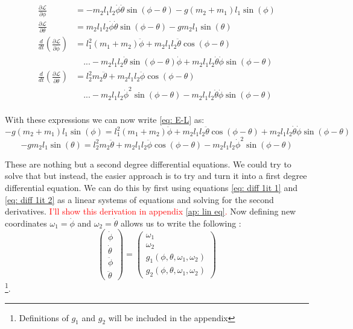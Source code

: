 \documentclass[twocolumn]{revtex4-2}
\newcommand{\Lagr}{\mathcal{L}}
\begin{document}
\begin{align*}
	\frac{\partial \Lagr}{\partial \phi} &= - m_2l_1l_2\dot \phi \dot \theta \sin{(\phi - \theta)} -
	g(m_2+m_1)l_1\sin{(\phi)} \\
	\frac{\partial \Lagr}{\partial \theta} &=  m_2l_1l_2\dot \phi \dot \theta \sin{(\phi - \theta)} -
	gm_2l_1\sin{(\theta)} \\
	\frac{d}{dt}\left(\frac{\partial \Lagr}{\partial \dot \phi} \right) &= l_1^2(m_1 +m_2)\ddot \phi +
	m_2l_1l_2\ddot \theta\cos{(\phi - \theta)}
	 \\
	& \quad ... - m_2l_1l_2\dot \theta \sin{(\phi - \theta)}\dot \phi  + m_2l_1l_2
\dot \theta \dot \phi \sin{(\phi - \theta)} \\
	\frac{d}{dt} \left( \frac{\partial \Lagr}{\partial \dot \theta} \right) &= l_2^2m_2\ddot \theta +
	m_2l_1l_2\ddot \phi\cos{(\phi - \theta)}
	 \\
	& \quad ... - m_2l_1l_2\dot \phi^{2} \sin{(\phi - \theta)}  - m_2l_1l_2
\dot \theta \dot \phi \sin{(\phi - \theta)} \\
\end{align*}

\begin{widetext}
With these expressions we can now write \ref{eq: E-L} as:
	\begin{equation}
 -g(m_2+m_1)l_1\sin{(\phi)} = 
 l_1^2(m_1 +m_2)\ddot \phi +
	m_2l_1l_2\ddot \theta\cos{(\phi - \theta)} + m_2l_1l_2
\dot \theta \dot \phi \sin{(\phi - \theta)} 
	\label{eq: diff 1it 1}
	\end{equation}
	\begin{equation}
- gm_2l_1\sin{(\theta)}  = 
 l_2^2m_2\ddot \theta +
	m_2l_1l_2\ddot \phi\cos{(\phi - \theta)}
	- m_2l_1l_2\dot \phi^{2} \sin{(\phi - \theta)} 
	\label{eq: diff 1it 2}
	\end{equation}
\end{widetext}
These are nothing but a second degree differential equations. We could try to solve that but instead, the easier approach is to try and turn it into a first degree differential equation. We can do this by first using equations \ref{eq: diff 1it 1} and \ref{eq: diff 1it 2} as a linear systems of equations and solving for the second derivatives.\textcolor{red}{ I'll show this derivation in appendix \ref{ap: lin eq}.} Now defining new coordinates $\omega_1 = \dot \phi$ and $\omega_2 = \dot \theta$ allows us to write the following :
\begin{equation}
	\left(
	\begin{array}{c}
		\dot \phi \\
		\dot \theta \\
		\ddot \phi \\
		\ddot \theta
	\end{array} \right)  =
	\left(\begin{array}{c}
		\omega_1 \\
		\omega_2 \\
		g_1(\phi, \theta, \omega_1, \omega_2) \\
		g_2(\phi, \theta, \omega_1, \omega_2)
	\end{array}\right)
\end{equation}
\footnote{Definitions of $g_1$ and $g_2$ will be included in the appendix}.
\end{document}
